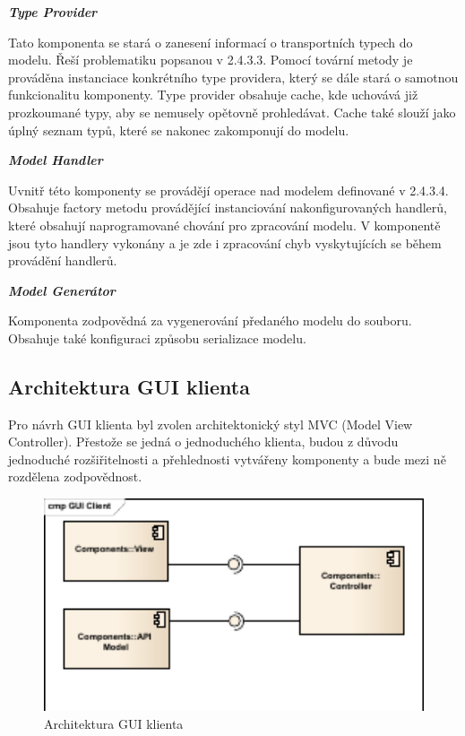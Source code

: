 \documentclass[11pt,twoside,a4paper]{book}
\begin{document}
\textbf{\textit{Type Provider}}

Tato komponenta se stará o zanesení informací o transportních typech do modelu. Řeší
problematiku popsanou v 2.4.3.3. Pomocí tovární metody je prováděna instanciace
konkrétního type providera, který se dále stará o samotnou funkcionalitu komponenty. Type
provider obsahuje cache, kde uchovává již prozkoumané typy, aby se nemusely opětovně
prohledávat. Cache také slouží jako úplný seznam typů, které se nakonec zakomponují do
modelu.

\textbf{\textit{Model Handler}}

Uvnitř této komponenty se provádějí operace nad modelem definované v 2.4.3.4. Obsahuje
factory metodu provádějící instanciování nakonfigurovaných handlerů, které obsahují
naprogramované chování pro zpracování modelu. V komponentě jsou tyto handlery vykonány
a je zde i zpracování chyb vyskytujících se během provádění handlerů.

\textbf{\textit{Model Generátor}}

Komponenta zodpovědná za vygenerování předaného modelu do souboru. Obsahuje také
konfiguraci způsobu serializace modelu.

\subsection{Architektura GUI klienta}

Pro návrh GUI klienta byl zvolen architektonický styl MVC (Model View Controller).
Přestože se jedná o jednoduchého klienta, budou z důvodu jednoduché rozšiřitelnosti a
přehlednosti vytvářeny komponenty a bude mezi ně rozdělena zodpovědnost.

\begin{figure}[h]
\begin{center}
\includegraphics[width=13cm]{images-pdf/GUI-Client.pdf}
\caption{Architektura GUI klienta}
\label{fig:logo}
\end{center}
\end{figure}
\end{document}
